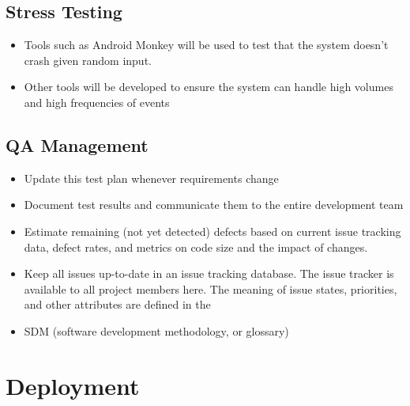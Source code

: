 \documentclass[11pt]{article}
\begin{document}
\subsection{Stress Testing}

\begin{itemize}
\item Tools such as Android Monkey will be used to test that the system doesn't crash given random input.
\item Other tools will be developed to ensure the system can handle high volumes and high frequencies of events
\end{itemize}

\subsection{QA Management}
\begin{itemize}
\item Update this test plan whenever requirements change
\item Document test results and communicate them to the entire development team
\item Estimate remaining (not yet detected) defects based on current issue tracking data, defect rates, and metrics on code size and the impact of changes.
\item Keep all issues up-to-date in an issue tracking database. The issue tracker is available to all project members here. The meaning of issue states, priorities, and other attributes are defined in the \item SDM (software development methodology, or glossary)
\end{itemize}

\section{Deployment}
\end{document}
